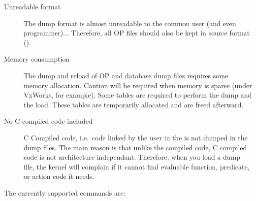 \begin{description}

\item[Unreadable format] The dump format is almost unreadable to the
common user (and even programmer)... Therefore, all OP files should also be
kept in source format ().

\item[Memory consumption] The dump and reload of OP and database dump files
requires some memory allocation.  Caution will be required when memory is sparse (under
VxWorks, for example). Some tables are required to perform the dump and the
load. These tables are temporarily allocated and are freed afterward. 

\item[No C compiled code included] C Compiled code, i.e.\ code linked by the
user in the \PK{} is not dumped in the \OPRS{} dump files. The main reason is
that unlike the \OPRS{} compiled code, C compiled code is not architecture
independant. Therefore, when you load a \OPRS{} dump file, the kernel will
complain if it cannot find evaluable function, predicate, or action code it
needs.

\end{description}

The currently supported commands are:

